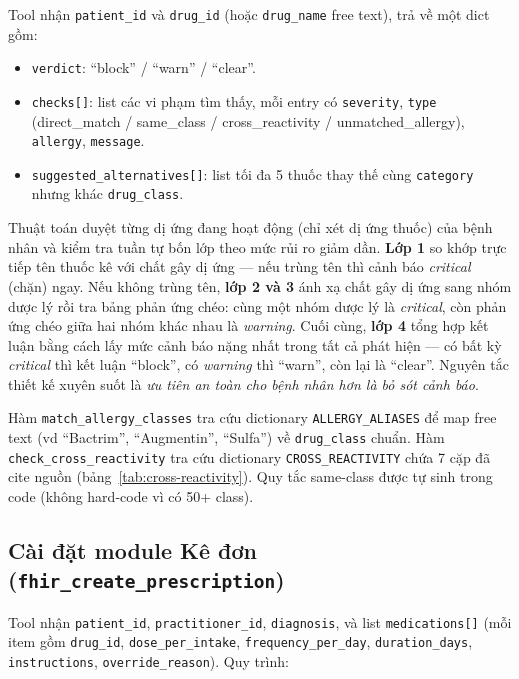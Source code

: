 \documentclass[a4paper,13pt,3p,oneside]{report}
\theoremstyle{definition}
\theoremstyle{remark}
\theoremstyle{definition}
\begin{document}
Tool nhận \texttt{patient\_id} và \texttt{drug\_id} (hoặc \texttt{drug\_name} free text), trả về một dict gồm:
\begin{itemize}
  \item \texttt{verdict}: ``block'' / ``warn'' / ``clear''.
  \item \texttt{checks[]}: list các vi phạm tìm thấy, mỗi entry có \texttt{severity}, \texttt{type} (direct\_match / same\_class / cross\_reactivity / unmatched\_allergy), \texttt{allergy}, \texttt{message}.
  \item \texttt{suggested\_alternatives[]}: list tối đa 5 thuốc thay thế cùng \texttt{category} nhưng khác \texttt{drug\_class}.
\end{itemize}

Thuật toán duyệt từng dị ứng đang hoạt động (chỉ xét dị ứng thuốc) của bệnh nhân và kiểm tra tuần tự bốn lớp theo mức rủi ro giảm dần. \textbf{Lớp 1} so khớp trực tiếp tên thuốc kê với chất gây dị ứng --- nếu trùng tên thì cảnh báo \textit{critical} (chặn) ngay. Nếu không trùng tên, \textbf{lớp 2 và 3} ánh xạ chất gây dị ứng sang nhóm dược lý rồi tra bảng phản ứng chéo: cùng một nhóm dược lý là \textit{critical}, còn phản ứng chéo giữa hai nhóm khác nhau là \textit{warning}. Cuối cùng, \textbf{lớp 4} tổng hợp kết luận bằng cách lấy mức cảnh báo nặng nhất trong tất cả phát hiện --- có bất kỳ \textit{critical} thì kết luận ``block'', có \textit{warning} thì ``warn'', còn lại là ``clear''. Nguyên tắc thiết kế xuyên suốt là \textit{ưu tiên an toàn cho bệnh nhân hơn là bỏ sót cảnh báo}.

Hàm \texttt{match\_allergy\_classes} tra cứu dictionary \texttt{ALLERGY\_ALIASES} để map free text (vd ``Bactrim'', ``Augmentin'', ``Sulfa'') về \texttt{drug\_class} chuẩn. Hàm \texttt{check\_cross\_reactivity} tra cứu dictionary \texttt{CROSS\_REACTIVITY} chứa 7 cặp đã cite nguồn (bảng~\ref{tab:cross-reactivity}). Quy tắc same-class được tự sinh trong code (không hard-code vì có 50+ class).

\subsection{Cài đặt module Kê đơn (\texttt{fhir\_create\_prescription})}

Tool nhận \texttt{patient\_id}, \texttt{practitioner\_id}, \texttt{diagnosis}, và list \texttt{medications[]} (mỗi item gồm \texttt{drug\_id}, \texttt{dose\_per\_intake}, \texttt{frequency\_per\_day}, \texttt{duration\_days}, \texttt{instructions}, \texttt{override\_reason}). Quy trình:
\end{document}
